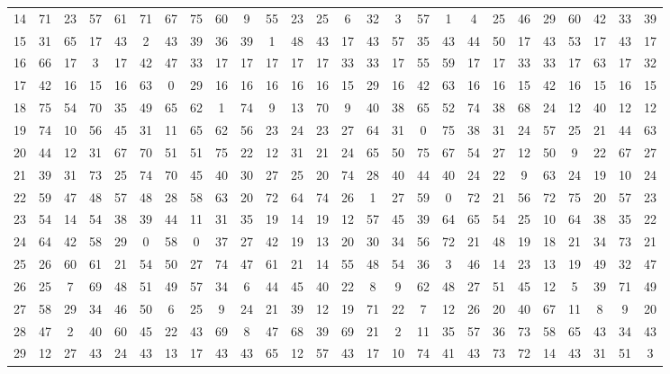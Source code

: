 \begin{table}
\begin{tabular}{c c c c c c c c c c c c c c c c c c c c c c c c c c }
14 & 71 & 23 & 57 & 61 & 71 & 67 & 75 & 60 & 9 & 55 & 23 & 25 & 6 & 32 & 3 & 57 & 1 & 4 & 25 & 46 & 29 & 60 & 42 & 33 & 39 \\
15 & 31 & 65 & 17 & 43 & 2 & 43 & 39 & 36 & 39 & 1 & 48 & 43 & 17 & 43 & 57 & 35 & 43 & 44 & 50 & 17 & 43 & 53 & 17 & 43 & 17 \\
16 & 66 & 17 & 3 & 17 & 42 & 47 & 33 & 17 & 17 & 17 & 17 & 17 & 33 & 33 & 17 & 55 & 59 & 17 & 17 & 33 & 33 & 17 & 63 & 17 & 32 \\
17 & 42 & 16 & 15 & 16 & 63 & 0 & 29 & 16 & 16 & 16 & 16 & 16 & 15 & 29 & 16 & 42 & 63 & 16 & 16 & 15 & 42 & 16 & 15 & 16 & 15 \\
18 & 75 & 54 & 70 & 35 & 49 & 65 & 62 & 1 & 74 & 9 & 13 & 70 & 9 & 40 & 38 & 65 & 52 & 74 & 38 & 68 & 24 & 12 & 40 & 12 & 12 \\
19 & 74 & 10 & 56 & 45 & 31 & 11 & 65 & 62 & 56 & 23 & 24 & 23 & 27 & 64 & 31 & 0 & 75 & 38 & 31 & 24 & 57 & 25 & 21 & 44 & 63 \\
20 & 44 & 12 & 31 & 67 & 70 & 51 & 51 & 75 & 22 & 12 & 31 & 21 & 24 & 65 & 50 & 75 & 67 & 54 & 27 & 12 & 50 & 9 & 22 & 67 & 27 \\
21 & 39 & 31 & 73 & 25 & 74 & 70 & 45 & 40 & 30 & 27 & 25 & 20 & 74 & 28 & 40 & 44 & 40 & 24 & 22 & 9 & 63 & 24 & 19 & 10 & 24 \\
22 & 59 & 47 & 48 & 57 & 48 & 28 & 58 & 63 & 20 & 72 & 64 & 74 & 26 & 1 & 27 & 59 & 0 & 72 & 21 & 56 & 72 & 75 & 20 & 57 & 23 \\
23 & 54 & 14 & 54 & 38 & 39 & 44 & 11 & 31 & 35 & 19 & 14 & 19 & 12 & 57 & 45 & 39 & 64 & 65 & 54 & 25 & 10 & 64 & 38 & 35 & 22 \\
24 & 64 & 42 & 58 & 29 & 0 & 58 & 0 & 37 & 27 & 42 & 19 & 13 & 20 & 30 & 34 & 56 & 72 & 21 & 48 & 19 & 18 & 21 & 34 & 73 & 21 \\
25 & 26 & 60 & 61 & 21 & 54 & 50 & 27 & 74 & 47 & 61 & 21 & 14 & 55 & 48 & 54 & 36 & 3 & 46 & 14 & 23 & 13 & 19 & 49 & 32 & 47 \\
26 & 25 & 7 & 69 & 48 & 51 & 49 & 57 & 34 & 6 & 44 & 45 & 40 & 22 & 8 & 9 & 62 & 48 & 27 & 51 & 45 & 12 & 5 & 39 & 71 & 49 \\
27 & 58 & 29 & 34 & 46 & 50 & 6 & 25 & 9 & 24 & 21 & 39 & 12 & 19 & 71 & 22 & 7 & 12 & 26 & 20 & 40 & 67 & 11 & 8 & 9 & 20 \\
28 & 47 & 2 & 40 & 60 & 45 & 22 & 43 & 69 & 8 & 47 & 68 & 39 & 69 & 21 & 2 & 11 & 35 & 57 & 36 & 73 & 58 & 65 & 43 & 34 & 43 \\
29 & 12 & 27 & 43 & 24 & 43 & 13 & 17 & 43 & 43 & 65 & 12 & 57 & 43 & 17 & 10 & 74 & 41 & 43 & 73 & 72 & 14 & 43 & 31 & 51 & 3 \\

\end{tabular}
\end{table}
